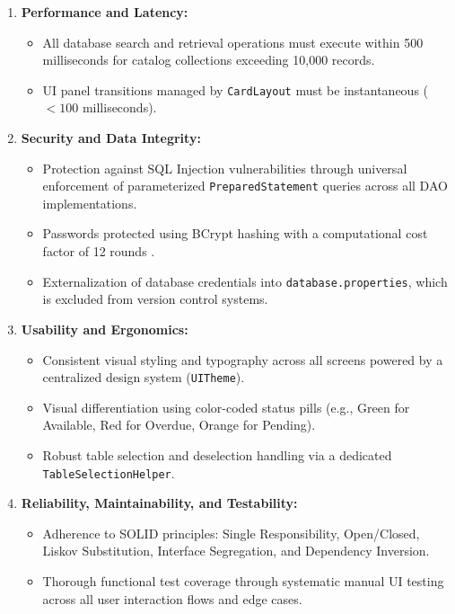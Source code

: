 \begin{enumerate}[label=\textbf{NFR-\arabic*:}, leftmargin=2.5cm]
    \item \textbf{Performance and Latency:}
    \begin{itemize}
        \item All database search and retrieval operations must execute within 500 milliseconds for catalog collections exceeding 10,000 records.
        \item UI panel transitions managed by \texttt{CardLayout} must be instantaneous ($< 100$ milliseconds).
    \end{itemize}

    \item \textbf{Security and Data Integrity:}
    \begin{itemize}
        \item Protection against SQL Injection vulnerabilities through universal enforcement of parameterized \texttt{PreparedStatement} queries across all DAO implementations.
        \item Passwords protected using BCrypt hashing with a computational cost factor of 12 rounds \cite{miller2020jbcrypt}.
        \item Externalization of database credentials into \texttt{database.properties}, which is excluded from version control systems.
    \end{itemize}

    \item \textbf{Usability and Ergonomics:}
    \begin{itemize}
        \item Consistent visual styling and typography across all screens powered by a centralized design system (\texttt{UITheme}).
        \item Visual differentiation using color-coded status pills (e.g., Green for Available, Red for Overdue, Orange for Pending).
        \item Robust table selection and deselection handling via a dedicated \texttt{TableSelectionHelper}.
    \end{itemize}

    \item \textbf{Reliability, Maintainability, and Testability:}
    \begin{itemize}
        \item Adherence to SOLID principles: Single Responsibility, Open/Closed, Liskov Substitution, Interface Segregation, and Dependency Inversion.
        \item Thorough functional test coverage through systematic manual UI testing across all user interaction flows and edge cases.
    \end{itemize}
\end{enumerate}

